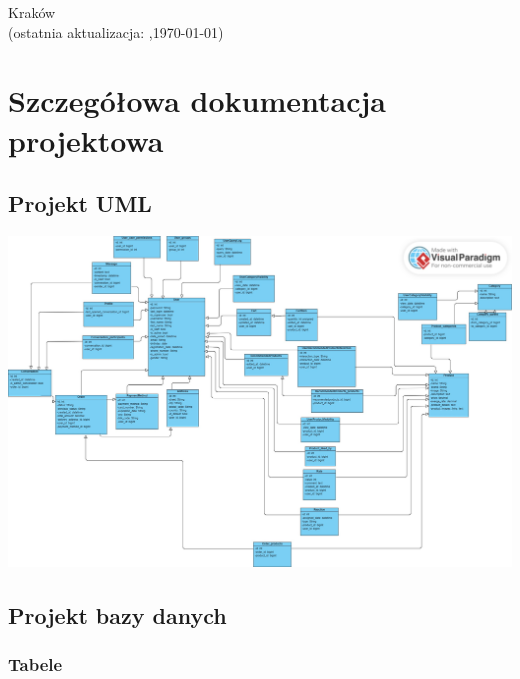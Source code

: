 \documentclass[12pt,a4paper,oneside]{article}
\theoremstyle{definition}
\numberwithin{equation}{section}
\begin{document}
\begin{titlepage}
\vspace*{\fill} %
\begin{center}
\large
Kraków \the\year\\
(ostatnia aktualizacja: \DTMcurrenttime,\;\today)
\end{center}
\end{titlepage}

\clearpage %

\tableofcontents


\newpage

\section{Szczegółowa dokumentacja projektowa}
\subsection{Projekt UML}
\begin{center}
\centering \includegraphics[width=1.0\columnwidth]{images/UML.jpg}
\end{center}

\subsection{Projekt bazy danych}
\subsubsection{Tabele}
\end{document}
